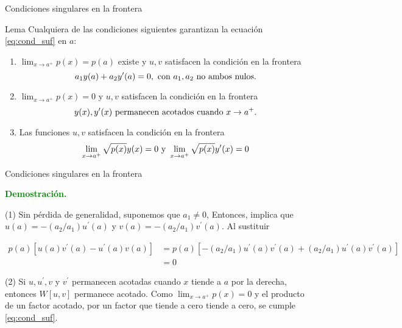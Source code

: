 \documentclass[xcolor=dvipsnames,a4paper,10pt,handout]{beamer}
\renewcommand{\textbf}[1]{\textcolor{green}{\bfseries #1}}
\begin{document}
\begin{frame}{Condiciones singulares en la frontera}



\begin{block}{Lema} Cualquiera de las  condiciones siguientes garantizan la ecuación \eqref{eq:cond_suf} en $a$:
    \begin{enumerate}
        \item<+-> $\lim _{x \rightarrow a^{+}} p(x)=p(a)$ existe y $u, v$ satisfacen la condición en la frontera
            \begin{equation}\label{eq:con_cont_1}
            a_{1} y(a)+a_{2} y^{\prime}(a)=0,\hbox{ con  }a_{1}, a_{2} \hbox{ no ambos nulos.}
            \end{equation}

        \item<+->$\lim_{x\to a^+}p(x)=0$ y $u, v$ satisfacen la condición en la frontera
            \begin{equation}\label{eq:con_cont_2}
                y(x), y^{\prime}(x) \hbox{ permanecen acotados cuando } x \rightarrow a^{+}.
            \end{equation} 
        \item<+-> Las funciones $u, v$ satisfacen la condición en la frontera
            \begin{equation}\label{eq:con_cont_3}
                \lim _{x \rightarrow a^{+}} \sqrt{p(x)} y(x)=0 \hbox{ y }\lim _{x \rightarrow a^{+}} \sqrt{p(x)} y^{\prime}(x)=0
            \end{equation}
       \end{enumerate}
\end{block}

\end{frame}



 
  
\begin{frame}{Condiciones singulares en la frontera}

\onslide<+->
\textbf{Demostración.}

(1) Sin pérdida de generalidad, suponemos que $a_{1} \neq 0$, Entonces,  implica que $u(a)=-\left(a_{2} / a_{1}\right) u^{\prime}(a)$ y $v(a)=-\left(a_{2} / a_{1}\right) v^{\prime}(a)$. Al sustituir

$$
\begin{aligned}
p(a)\left[u(a) v^{\prime}(a)-u^{\prime}(a) v(a)\right] &=p(a)\left[-\left(a_{2} / a_{1}\right) u^{\prime}(a) v^{\prime}(a)+\left(a_{2} / a_{1}\right) u^{\prime}(a) v^{\prime}(a)\right] \\
&=0
\end{aligned}
$$

\onslide<+->
(2)  Si $u, u^{\prime}, v$ y $ v^{\prime}$ permanecen acotadas cuando $x$ tiende a $a$ por la derecha, entonces  $W[u,v]$ permanece acotado. Como $\lim_{x \rightarrow a^{+}} p(x)=0$ y el producto de un factor acotado, por un factor que tiende a cero tiende a cero,  se cumple \eqref{eq:cond_suf}.

\end{frame}
\end{document}
